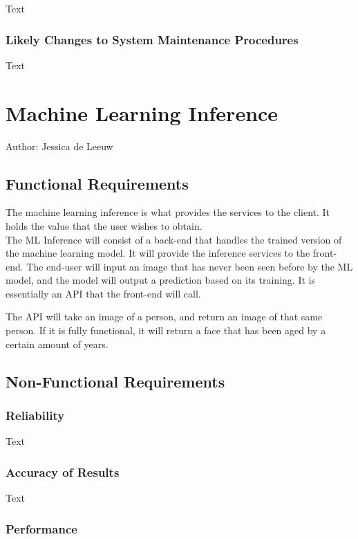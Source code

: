 \documentclass[12pt]{article}
\begin{document}
Text

\subsubsection {Likely Changes to System Maintenance Procedures}

Text

\section{Machine Learning Inference}
Author: Jessica de Leeuw\\

\subsection{Functional Requirements}

The machine learning inference is what provides the services to the client. It holds the value that the user wishes to obtain.\\

The ML Inference will consist of a back-end that handles the trained version of the machine learning model. It will provide the inference services to the front-end. The end-user will input an image that has never been seen before by the ML model, and the model will output a prediction based on its training. It is essentially an API that the front-end will call.

The API will take an image of a person, and return an image of that same person. If it is fully functional, it will return a face that has been aged by a certain amount of years.

\subsection{Non-Functional Requirements}

\subsubsection {Reliability}

Text

\subsubsection {Accuracy of Results}

Text

\subsubsection {Performance}
\end{document}
